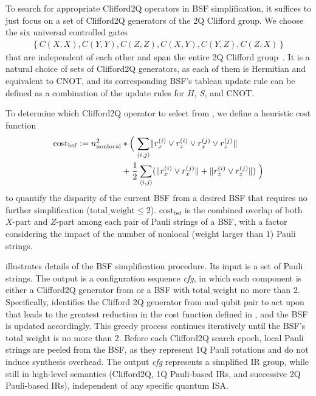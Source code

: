 \documentclass[conference,9pt]{IEEEtran}
\newcommand{\CNOT}{\mathrm{CNOT}}
\newcommand{\totalWeight}{\mathrm{total\_weight}}
\begin{document}
    

    To search for appropriate Clifford2Q operators in BSF simplification, it suffices to just focus on a set of Clifford2Q generators of the 2Q Clifford group. We choose the six universal controlled gates
    \begin{align}
        \left\{ C(X,X), C(Y,Y), C(Z,Z), C(X,Y), C(Y,Z), C(Z,X) \right\}\label{eq:clifford-generators}
    \end{align}
    that are independent of each other and span the entire 2Q Clifford group~\cite{grier2022classification}. It is a natural choice of sets of Clifford2Q generators, as each of them is Hermitian and equivalent to $ \CNOT $, and its corresponding BSF's tableau update rule can be defined as a combination of the update rules for $ H $, $ S $, and $ \CNOT $. 

    To determine which Clifford2Q operator to select from , we define a heuristic cost function%
    \begin{align}
        \mathrm{cost}_{\mathrm{bsf}} :=  n_{\mathrm{nonlocal}}^2 &* \left(\vphantom{\sum}\right. \sum_{\langle i,j \rangle} \lVert r_x^{(i)} \lor r_z^{(i)} \lor r_x^{(j)} \lor r_z^{(j)} \rVert  \notag\\
    & + \frac{1}{2} \sum_{\langle i,j \rangle} (\lVert r_x^{(i)} \lor r_x^{(j)} \rVert + \lVert r_z^{(i)} \lor r_z^{(j)} \rVert)\left.\vphantom{\sum}\right) \label{eq:cost-bsf}
    \end{align}
    to quantify the disparity of the current BSF from a desired BSF that requires no further simplification ($ \totalWeight \leq 2 $). $ \mathrm{cost}_{\mathrm{bsf}} $ is the combined overlap of both $ X $-part and $ Z $-part among each pair of Pauli strings of a BSF, with a factor considering the impact of the number of nonlocal (weight larger than 1) Pauli strings. %
    
     illustrates details of the BSF simplification procedure. Its input is a set of Pauli strings. The output is a configuration sequence \textit{cfg}, in which each component is either a Clifford2Q generator from  or a BSF with $ \totalWeight $ no more than 2. Specifically,  identifies the Clifford 2Q generator from  and qubit pair to act upon that leads to the greatest reduction in the cost function defined in , and the BSF is updated accordingly. This greedy process continues iteratively until the BSF's $ \totalWeight $ is no more than 2. Before each Clifford2Q search epoch, local Pauli strings are peeled from the BSF, as they represent 1Q Pauli rotations and do not induce synthesis overhead. The output \textit{cfg} represents a simplified IR group, while still in high-level semantics (Clifford2Q, 1Q Pauli-based IRs, and successive 2Q Pauli-based IRs), independent of any specific quantum ISA.
\end{document}
